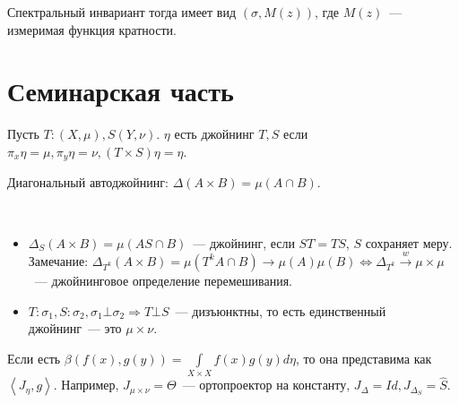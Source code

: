 \documentclass{article}
\begin{document}
Спектральный инвариант тогда имеет вид $(\sigma, M(z))$, где $M(z)$~---
измеримая функция кратности.

\section{Семинарская часть}

\begin{definition}
	Пусть $T: (X, \mu), S(Y, \nu)$. $\eta$ есть джойнинг $T, S$ если $\pi_x
	\eta = \mu, \pi_y \eta = \nu, (T \times S) \eta = \eta$.
\end{definition}

Диагональный автоджойнинг: $\Delta(A \times B) = \mu(A \cap B)$.

\begin{exercise}~
	\begin{itemize}
		\item $\Delta_S (A \times B) = \mu(AS \cap B)$~--- джойнинг, если $ST = TS$,
			$S$ сохраняет меру. Замечание: $\Delta_{T^k}(A \times B) = \mu(T^k A \cap
			B) \rightarrow \mu(A) \mu(B) \Leftrightarrow \Delta_{T^k}
			\overset{w}\rightarrow \mu \times \mu$~--- джойнинговое определение
			перемешивания.
		\item $T: \sigma_1, S: \sigma_2, \sigma_1 \bot \sigma_2 \Rightarrow T \bot
			S$~--- дизъюнктны, то есть единственный джойнинг~--- это $\mu \times \nu$.
	\end{itemize}
\end{exercise}

Если есть $\beta(f(x), g(y)) = \int\limits_{X \times X} f(x)g(y) d\eta$, то она
представима как $\left< J_\eta, g \right>$. Например, $J_{\mu \times \nu} =
\Theta$~--- ортопроектор на константу, $J_\Delta = Id, J_{\Delta_S} = \hat S$.
\end{document}
